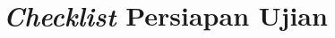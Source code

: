 \chapter{\textit{Checklist} Persiapan Ujian}
\label{lamp:A}
\begin{minipage}{\textwidth}
    
\end{minipage}